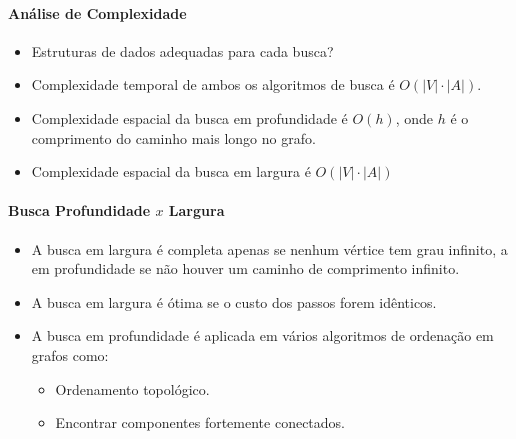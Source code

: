 

\begin{frame}
	\framesubtitle{Análise de Complexidade}
	
	\begin{itemize}[<+->]
		\item Estruturas de dados adequadas para cada busca?
		\item Complexidade temporal de ambos os algoritmos de busca é $O(|V|{\cdot}|A|)$.
		\vfill
		\item Complexidade espacial da busca em profundidade é $O(h)$, onde $h$ 
		é o comprimento do caminho mais longo no grafo.
		\item Complexidade espacial da busca em largura é $O(|V|{\cdot}|A|)$
	\end{itemize}
\end{frame}

\begin{frame}
	\framesubtitle{Busca Profundidade $x$ Largura}
	
	\begin{itemize}
		\item A busca em largura é completa apenas se nenhum vértice tem grau infinito\pause, a em profundidade se não houver um caminho de comprimento infinito.\vfill
		\item A busca em largura é ótima se o custo dos passos forem  idênticos.
		\pause\vfill
		\item A busca em profundidade é aplicada em vários algoritmos de ordenação 
		em grafos como:
		\begin{itemize}
	\item Ordenamento topológico.
	\item Encontrar componentes fortemente conectados.
		\end{itemize}
	\end{itemize}
\end{frame}


